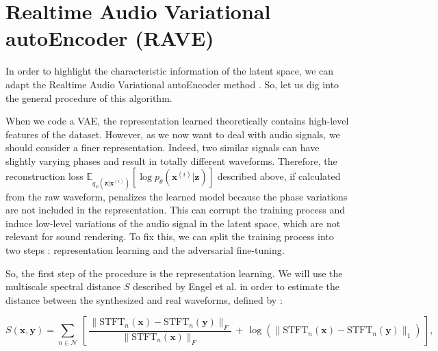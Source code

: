 \documentclass{article}
\begin{document}


\section{Realtime Audio Variational autoEncoder (RAVE)}

In order to highlight the characteristic information of the latent space, we can adapt the Realtime Audio Variational autoEncoder method \cite{caillonRAVEVariationalAutoencoder2021}. So, let us dig into the general procedure of this algorithm. 

When we code a VAE, the representation learned theoretically contains high-level features of the dataset. However, as we now want to deal with audio signals, we should consider a 
finer representation. Indeed, two similar signals can have slightly varying phases and result in totally different waveforms. Therefore, the reconstruction loss $\mathbb{E}_{q_\phi(\textbf{z} | \textbf{x}^{(i)})} [\log p_\theta(\textbf{x}^{(i)} | \textbf{z})]$ 
described above, if calculated from the raw waveform, penalizes the learned model because the phase variations are not included in the representation. This can corrupt the training process and induce low-level variations of the audio signal in the latent space, which are not relevant for sound rendering. To fix this, we can split the training process into two steps : representation learning and the adversarial fine-tuning.

So, the first step of the procedure is the representation learning. We will use the multiscale spectral distance $S$ described by Engel et al. \cite{engelDDSPDifferentiableDigital2020} in order to estimate the distance between the synthesized and real waveforms, defined by : 

\begin{equation} \label{spectral_dist}
    S(\textbf{x},\textbf{y}) = \sum_{n \in \mathcal{N}}\, \left[\, \frac{\lVert \text{STFT}_n(\textbf{x}) - \text{STFT}_n(\textbf{y}) \rVert_F}{\lVert \text{STFT}_n(\textbf{x}) \rVert_F} \,+\, \log (\lVert \text{STFT}_n(\textbf{x}) - \text{STFT}_n(\textbf{y}) \rVert_1)   \,\right],
\end{equation}
\end{document}
